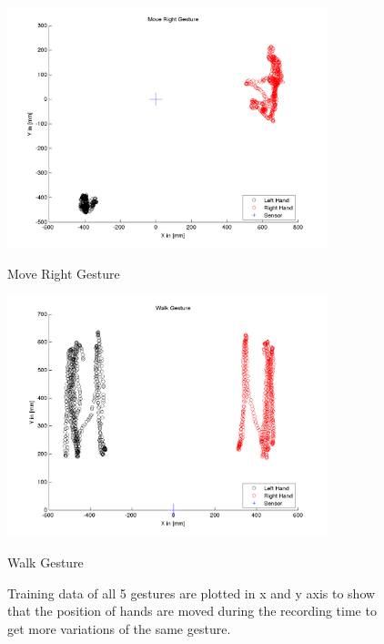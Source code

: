 \begin{figure}
\begin{minipage}
	\end{minipage}
	\begin{minipage}
		{.5 
		\textwidth} 
		\includegraphics[height=70mm]{figures/result/train-move-right.jpg} \caption*{Move Right Gesture} 
	\end{minipage}
	\begin{minipage}
		{.5 
		\textwidth} \hspace{-15 mm} 
		\includegraphics[height=70mm]{figures/result/train-walk.jpg} \caption*{Walk Gesture} 
	\end{minipage}
	\caption{Training data of all 5 gestures are plotted in x and y axis to show that the position of hands are moved during the recording time to get more variations of the same gesture.} \label{pl:ges:pos} 
\end{figure}
